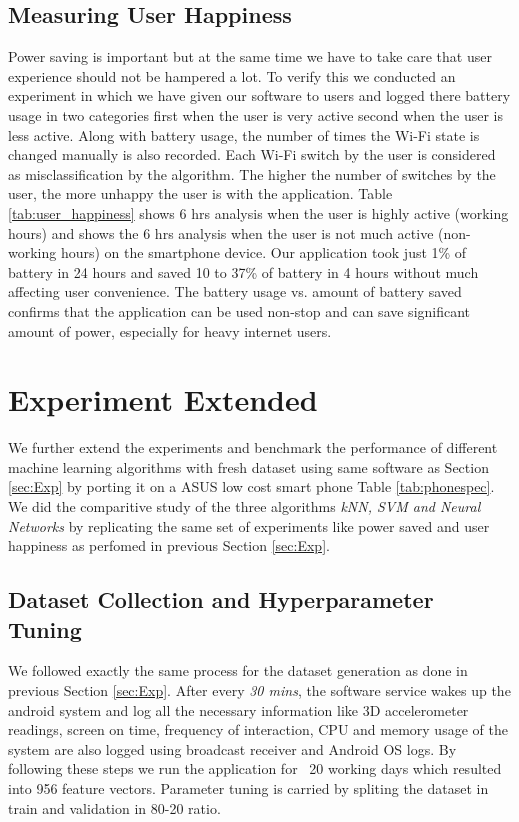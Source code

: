 \subsection{Measuring User Happiness}
\label{userhapiness}
Power saving is important but at the same time
we have to take care that user experience should not be hampered a lot. To verify this
we conducted an experiment in which we have given our software to users and logged there
battery usage in two categories first when the user is very active second when the user
is less active. Along with battery usage, the number of times the Wi-Fi state is changed manually is also recorded. Each Wi-Fi switch by the user is considered as misclassification by the algorithm. The higher the number of switches by the user, the more unhappy the user is with the application.
Table \ref{tab:user_happiness} shows 6 hrs analysis when the user is highly active (working hours) and shows the 6 hrs analysis when the user is not much active (non-working hours) on the smartphone device.
Our application took just 1\% of battery in 24 hours and saved 10 to 37\% of battery in 4 hours without much affecting
user convenience. The battery usage vs. amount of battery saved confirms that the application can be used non-stop and can save significant amount of power, especially for heavy internet users.



\section{Experiment Extended}
We further extend the experiments and benchmark the performance of different machine learning algorithms with fresh dataset using same software as Section \ref{sec:Exp} by porting it on a ASUS low cost smart phone Table \ref{tab:phonespec}. We did the comparitive study of the three algorithms \textit{kNN, SVM and Neural Networks} by replicating the same set of experiments like power saved and user happiness as perfomed in previous Section \ref{sec:Exp}.

\subsection{Dataset Collection and Hyperparameter Tuning}
We followed exactly the same process for the dataset generation as done in previous Section \ref{sec:Exp}. After
every \textit{30 mins}, the software service wakes up the android system and log all the necessary information like 3D accelerometer readings, screen on time, frequency of interaction, CPU and memory usage of the system are also logged using broadcast receiver and Android OS logs. By following these steps we run the application for ~20 working days which resulted into 956 feature vectors. Parameter tuning is carried by spliting the dataset in train and validation in 80-20 ratio.
